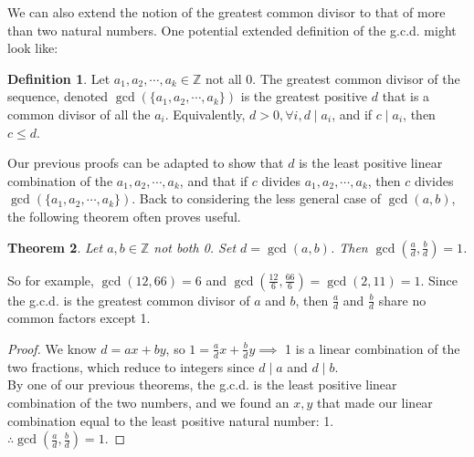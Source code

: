 \documentclass[11pt]{amsart}
\newtheorem{theorem}{Theorem}[section]
\theoremstyle{definition}
\newtheorem{definition}[theorem]{Definition}
\newcommand{\integers}{\mathbb{Z}}
\begin{document}
We can also extend the notion of the greatest common divisor to that of more than two natural numbers. One potential extended definition of the
g.c.d. might look like:
\begin{definition}
	Let $a_1, a_2, \cdots, a_k \in \integers$ not all 0. The greatest common divisor of the sequence, denoted $\gcd(\{a_1, a_2, \cdots, a_k \})$
	is the greatest positive $d$ that is a common divisor of all the $a_i$. Equivalently, $d > 0, \forall i, d \mid a_i$, and if $c \mid a_i$, then
	$c \leq d$.
\end{definition}
Our previous proofs can be adapted to show that $d$ is the least positive linear combination of the $a_1, a_2, \cdots, a_k$, and that if $c$
divides $a_1, a_2, \cdots, a_k$, then $c$ divides $\gcd(\{ a_1, a_2, \cdots, a_k \})$. Back to considering the less general case of $\gcd(a, b)$,
the following theorem often proves useful.
\begin{theorem}
	Let $a, b \in \integers$ not both 0. Set $d = \gcd(a, b)$. Then $\gcd(\frac{a}{d}, \frac{b}{d}) = 1$.
\end{theorem}
So for example, $\gcd(12, 66) = 6$ and $\gcd(\frac{12}{6}, \frac{66}{6}) = \gcd(2, 11) = 1$. Since the g.c.d. is the greatest common divisor of
$a$ and $b$, then $\frac{a}{d}$ and $\frac{b}{d}$ share no common factors except 1.
\begin{proof}
	We know $d = ax + by$, so $1 = \frac{a}{d}x + \frac{b}{d}y \implies$ 1 is a linear combination of the two fractions, which reduce to integers
	since $d \mid a$ and $d \mid b$. \\
	By one of our previous theorems, the g.c.d. is the least positive linear combination of the two numbers, and we found an $x, y$ that
	made our linear combination equal to the least positive natural number: 1. \\
	$\therefore \gcd(\frac{a}{d}, \frac{b}{d}) = 1$.
\end{proof}
\end{document}
